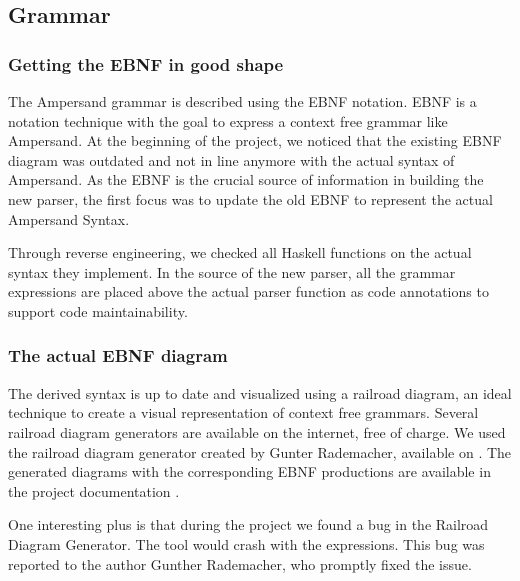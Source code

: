 
\subsection{Grammar}
\label{analysis:grammar}

\subsubsection{Getting the EBNF in good shape}
%
%
The Ampersand grammar is described using the EBNF notation. 
EBNF is a notation technique with the goal to express a context free grammar like Ampersand.
At the beginning of the project, we noticed that the existing EBNF diagram was outdated and not in line anymore with the actual syntax of Ampersand.
As the EBNF is the crucial source of information in building the new parser, the first focus was to update the old EBNF to represent the actual Ampersand Syntax.

Through reverse engineering, we checked all Haskell functions on the actual syntax they implement.
In the source of the new parser, all the grammar expressions are placed above the actual parser function as code annotations to support code maintainability.

\subsubsection{The actual EBNF diagram}
The derived syntax is up to date and visualized using a railroad diagram, an ideal technique to create a visual representation of context free grammars.
Several railroad diagram generators are available on the internet, free of charge.
We used the railroad diagram generator created by Gunter Rademacher, available on .
The generated diagrams with the corresponding EBNF productions are available in the project documentation .

One interesting plus is that during the project we found a bug in the Railroad Diagram Generator.
The tool would crash with the  expressions.
This bug was reported to the author Gunther Rademacher, who promptly fixed the issue.
